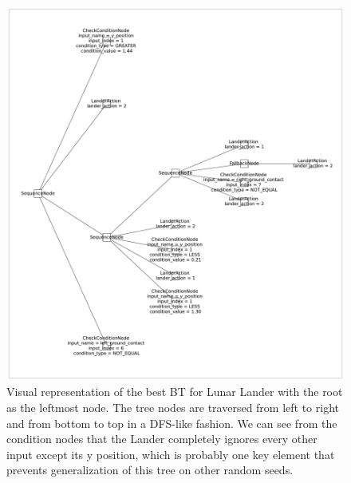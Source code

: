 \begin{figure}
    \centering
    \includegraphics[width=1\linewidth]{./images/lander_BT.pdf}
    \caption{Visual representation of the best BT for Lunar Lander with the root as the leftmost node. The tree nodes are traversed from left to right and from bottom to top in a DFS-like fashion. We can see from the condition nodes that the Lander completely ignores every other input except its y position, which is probably one key element that prevents generalization of this tree on other random seeds. }
    \label{fig:lander-bt-figure}
\end{figure}

